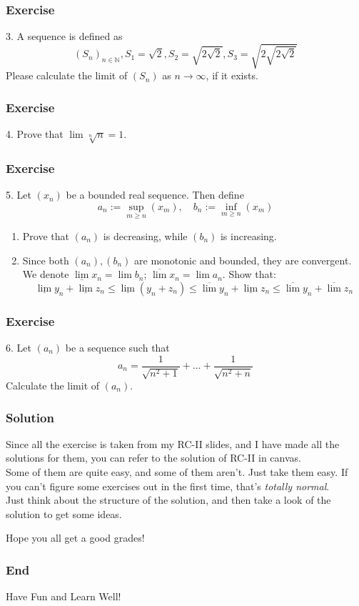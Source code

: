 \documentclass[12pt, t]{beamer}
\renewcommand{\emph}[1]{{\color{Turquoise3}\textsl{#1}}}
\begin{document}
\begin{frame}
    \frametitle{Exercise}
3. A sequence is defined as
\begin{equation*}
    (S_n)_{n\in\mathbb{N}}, S_1=\sqrt{2}, S_2=\sqrt{2\sqrt{2}}, S_3=\sqrt{2\sqrt{2\sqrt{2}}}
\end{equation*}
Please calculate the limit of $(S_n)$ as $n\rightarrow \infty$, if it exists.
\end{frame}

\begin{frame}
    \frametitle{Exercise}
4. Prove that $\lim \sqrt[n]{n}=1$.
\end{frame}

\begin{frame}
    \frametitle{Exercise}
5. Let $(x_n)$ be a bounded real sequence. Then define
\begin{equation*}
     a_n:=\sup_{m\geq n}(x_m),\quad b_n:=\inf_{m\geq n}(x_m) 
\end{equation*}

\begin{enumerate}
    \item Prove that $(a_n)$ is decreasing, while $(b_n)$ is increasing.
    \item Since both $(a_n),(b_n)$ are monotonic and bounded, they are convergent. 
        We denote $\underline{\lim} x_n=\lim b_n$; $\overline{\lim}x_n=\lim a_n$. Show that:
        \begin{equation*}
            \underline{\lim}y_n+\underline{\lim}z_n\leq \underline{\lim} (y_n+z_n)\leq\overline{\lim}y_n+\underline{\lim}z_n\leq\overline{\lim}y_n+\overline{\lim}z_n
        \end{equation*}
\end{enumerate}
\end{frame}

\begin{frame}
    \frametitle{Exercise}
6. Let $(a_n)$ be a sequence such that 
\begin{equation*}
    a_n=\frac{1}{\sqrt{n^2+1}}+\dots+\frac{1}{\sqrt{n^2+n}}
\end{equation*}
Calculate the limit of $(a_n)$.
\end{frame}

\begin{frame}
    \frametitle{Solution}

Since all the exercise is taken from my RC-II slides, and I have made all the solutions for them, you can refer to the solution of RC-II in canvas.\\
\vspace{1em}
Some of them are quite easy, and some of them aren't. Just take them easy. If you can't figure some exercises out in the first time, that's \emph{totally normal}.\\
\vspace{1em}
Just think about the structure of the solution, and then take a look of the solution to get some ideas.\\
\vspace{1.5em}
\begin{center}
    Hope you all get a good grades!
\end{center}

\end{frame}

\begin{frame}
    \frametitle{End}
    \vspace{2cm}
    \Huge \center  Have Fun and Learn Well!
\end{frame}
\end{document}
